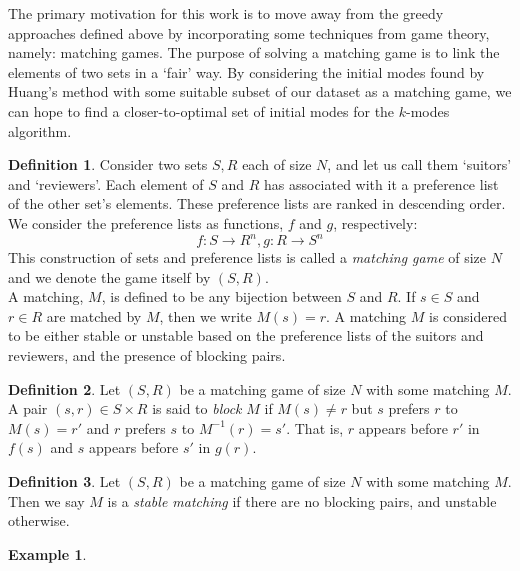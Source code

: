 \documentclass{article}
\theoremstyle{definition}
\newtheorem{definition}{Definition}[section]
\newtheorem{example}{Example}
\begin{document}
The primary motivation for this work is to move away from the greedy approaches
defined above by incorporating some techniques from game theory, namely:
matching games. The purpose of solving a matching game is to link the elements
of two sets in a `fair' way. By considering the initial modes found by Huang's 
method with some suitable subset of our dataset as a matching game, we can hope
to find a closer-to-optimal set of initial modes for the $k$-modes algorithm.


\begin{definition}\label{def:matching-game}
	Consider two sets $S, R$ each of size $N$, and let us call them 
	`suitors' and `reviewers'. Each element of $S$ and $R$ has associated 
	with it a preference list of the other set's elements. These preference
	lists are ranked in descending order. We consider the preference lists 
	as functions, $f$ and $g$, respectively:
	\[
	f : S \to R^n, g : R \to S^n
	\]
	This construction of sets and preference lists is called a 
	\emph{matching game} of size $N$ and we denote the game itself by $(S,
	R)$. \\
	
	A matching, $M$, is defined to be any bijection between $S$ and $R$. 
	If $s \in S$ and $r \in R$ are matched by $M$, then we write $M(s) = r$.
	A matching $M$ is considered to be either stable or unstable based on 
	the preference lists of the suitors and reviewers, and the presence of
	blocking pairs.
\end{definition}

\begin{definition}\label{def:blocking-pair}
	Let $(S, R)$ be a matching game of size $N$ with some matching $M$. A 
	pair $(s, r) \in S \times R$ is said to \emph{block} $M$ if $M(s) \ne r$
	but $s$ prefers $r$ to $M(s) = r'$ and $r$ prefers $s$ to $M^{-1}(r) = 
	s'$. That is, $r$ appears before $r'$ in $f(s)$ and $s$ appears before 
	$s'$ in $g(r)$.
\end{definition}

\begin{definition}\label{def:stable-matching}
	Let $(S, R)$ be a matching game of size $N$ with some matching $M$. Then
	we say $M$ is a \emph{stable matching} if there are no blocking pairs,
	and unstable otherwise.
\end{definition}

\begin{example}\label{example:matching}

\end{example}
\end{document}
